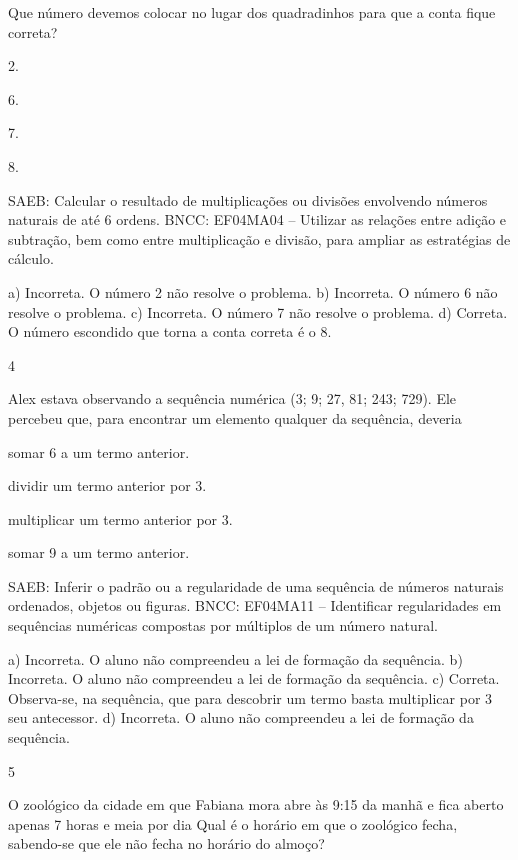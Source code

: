 \begin{mdframed}[linewidth=2pt,linecolor=salmao,roundcorner=2pt]
\begin{escolha}
{\begin{escolha}
Que número devemos colocar no lugar dos quadradinhos para que a conta
fique correta?

\begin{escolha}
\item
  2.
\item
  6.
\item
  7.
\item
  8.
\end{escolha}

SAEB: Calcular o resultado de multiplicações ou divisões
envolvendo números naturais de até 6 ordens.
BNCC: EF04MA04 -- Utilizar as relações entre adição e subtração, bem como entre multiplicação e divisão,
para ampliar as estratégias de cálculo.

a) Incorreta. O número 2 não resolve o problema.
b) Incorreta. O número 6 não resolve o problema.
c) Incorreta. O número 7 não resolve o problema.
d) Correta. O número escondido que torna a conta correta é o 8.

\num{4}

Alex estava observando a sequência numérica (3; 9; 27, 81; 243; 729).
Ele percebeu que, para encontrar um elemento qualquer da sequência,
deveria

\begin{escolha}
\item
  somar 6 a um termo anterior.
\item
  dividir um termo anterior por 3.
\item
  multiplicar um termo anterior por 3.
\item
  somar 9 a um termo anterior.
\end{escolha}

SAEB: Inferir o padrão ou a regularidade de uma sequência de
números naturais ordenados, objetos ou figuras.
BNCC: EF04MA11 -- Identificar regularidades em sequências numéricas compostas por múltiplos de um
número natural.

a) Incorreta. O aluno não compreendeu a lei de formação da sequência.
b) Incorreta. O aluno não compreendeu a lei de formação da sequência.
c) Correta. Observa-se, na sequência, que para descobrir um termo basta
multiplicar por 3 seu antecessor.
d) Incorreta. O aluno não compreendeu a lei de formação da sequência.

\num{5}

O zoológico da cidade em que Fabiana mora abre às 9:15 da manhã e fica
aberto apenas 7 horas e meia por dia Qual é o horário em que o zoológico
fecha, sabendo-se que ele não fecha no horário do almoço?


\end{escolha}}
\end{escolha}
\end{mdframed}
